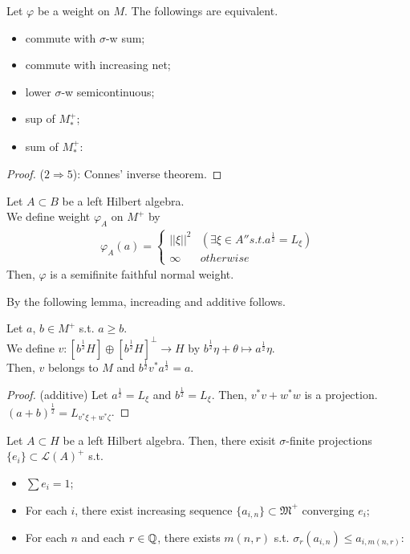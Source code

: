 \begin{proposition}
  Let $\varphi$ be a weight on $M$. The followings are equivalent.
  \begin{itemize}
    \item commute with $\sigma$-w sum;
    \item commute with increasing net;
    \item lower $\sigma$-w semicontinuous;
    \item sup of $M_*^+$;
    \item sum of $M_*^+$:
  \end{itemize}
\end{proposition}

\begin{proof}
  ($2 \Rightarrow 5$): Connes' inverse theorem.
\end{proof}

\begin{theorem}
  Let $A \subset B$ be a left Hilbert algebra. \\
  We define weight $\varphi_A$ on $M^+$ by
  \begin{align*}
    \varphi_A(a) = \left\{ \begin{array}{ll} ||\xi||^2 & (\exists \xi \in A'' s.t. a^{\frac{1}{2}}=L_{\xi})\\
      \infty & otherwise
    \end{array} \right.
  \end{align*}
  Then, $\varphi$ is a semifinite faithful normal weight.
\end{theorem}

By the following lemma, increading and additive follows.
\begin{lemma}
  Let $a$, $b \in M^+$ s.t. $a \geq b$. \\
  We define $v:[b^{\frac{1}{2}}H]\oplus[b^{\frac{1}{2}}H]^{\perp} \rightarrow H$ by $b^{\frac{1}{2}}\eta + \theta \mapsto a^{\frac{1}{2}}\eta$. \\
  Then, $v$ belongs to $M$ and $b^{\frac{1}{2}}v^*a^{\frac{1}{2}}=a$.
\end{lemma}

\begin{proof}(additive)
  Let $a^{\frac{1}{2}}=L_\xi$ and $b^{\frac{1}{2}}=L_\xi$. Then, $v^*v+w^*w$ is a projection. $(a+b)^{\frac{1}{2}}=L_{v^*\xi+w^*\zeta}$.
\end{proof}

\begin{lemma}
  Let $A \subset H$ be a left Hilbert algebra.
  Then, there exisit $\sigma$-finite projections $\{e_i\} \subset \mathcal{L}(A)^+$ s.t.
  \begin{itemize}
    \item $\sum e_i =1$;
    \item For each $i$, there exist increasing sequence $\{a_{i,n}\} \subset \mathfrak{M}^+$ converging $e_i$;
    \item For each $n$ and each $r \in \mathbb{Q}$, there exists $m(n,r)$ s.t. $\sigma_r(a_{i,n}) \leq a_{i,m(n,r)}$:
  \end{itemize}
\end{lemma}

